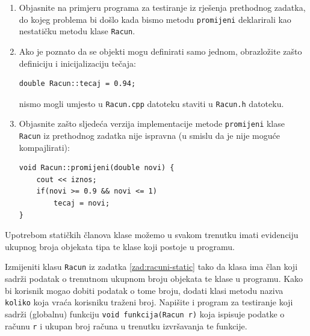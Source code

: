 \begin{razmisljanje}
    \begin{enumerate}
        \item 
        Objasnite na primjeru programa za testiranje iz
        rješenja prethodnog zadatka,
        do kojeg problema bi došlo kada bismo metodu \texttt{promijeni}
        deklarirali kao nestatičku metodu klase \texttt{Racun}.
        
        \item 
        Ako je poznato da se objekti mogu definirati samo jednom, 
        obrazložite zašto definiciju i inicijalizaciju
        tečaja:
        \begin{verbatim}
double Racun::tecaj = 0.94;
\end{verbatim}
    nismo mogli umjesto u \texttt{Racun.cpp} datoteku
    staviti u \texttt{Racun.h} datoteku.

    \item 
    Objasnite zašto sljedeća verzija implementacije metode \texttt{promijeni}
    klase \texttt{Racun} iz prethodnog zadatka nije ispravna
    (u smislu da je nije moguće kompajlirati):

    \begin{verbatim}
void Racun::promijeni(double novi) {
    cout << iznos;
    if(novi >= 0.9 && novi <= 1)
        tecaj = novi;
}
    \end{verbatim}
\end{enumerate}
\end{razmisljanje}



Upotrebom statičkih članova klase možemo u svakom trenutku
imati evidenciju ukupnog broja objekata tipa te klase
koji postoje u programu.


\begin{zadatak}\label{zad:racuni-ukupno}
    Izmijeniti klasu \texttt{Racun} iz zadatka \ref{zad:racuni-static}
    tako da klasa ima član koji sadrži podatak
    o trenutnom ukupnom broju objekata te klase u programu.
    Kako bi korisnik mogao dobiti podatak o tome broju,
    dodati klasi metodu naziva \texttt{koliko}
    koja vraća korisniku traženi broj.
    Napišite i program za testiranje koji sadrži 
    (globalnu) funkciju
    \texttt{void funkcija(Racun r)}
    koja ispisuje podatke o računu \texttt{r}
    i ukupan broj računa u trenutku izvršavanja te funkcije.
\end{zadatak}


